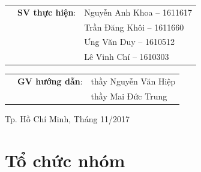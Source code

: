 \documentclass[a4paper]{article}
\begin{document}
\begin{titlepage}
\begin{table}[h]
\begin{tabular}{rrl}
\hspace{5cm} & \textbf{SV thực hiện}: & Nguyễn Anh Khoa -- 1611617 \\
& &Trần Đăng Khôi -- 1611660\\
& &Ưng Văn Duy -- 1610512\\
& &Lê Vinh Chí -- 1610303

\end{tabular}
\end{table}
\vspace{-0.2cm}

\begin{table}[h]
\begin{tabular}{rrl}
\hspace{5cm} & \textbf{GV hướng dẫn}: &thầy Nguyễn Văn Hiệp \\
& &thầy Mai Đức Trung\\


\end{tabular}
\end{table}
\vspace{1cm}

\begin{center}
{\footnotesize Tp. Hồ Chí Minh, Tháng 11/2017}
\end{center}
\end{titlepage}

\newpage
\thispagestyle{empty}
\tableofcontents

\newpage
\thispagestyle{empty}
\listoftables

\newpage
\thispagestyle{empty}
\listoffigures

\newpage

\section{Tổ chức nhóm}
\end{document}

